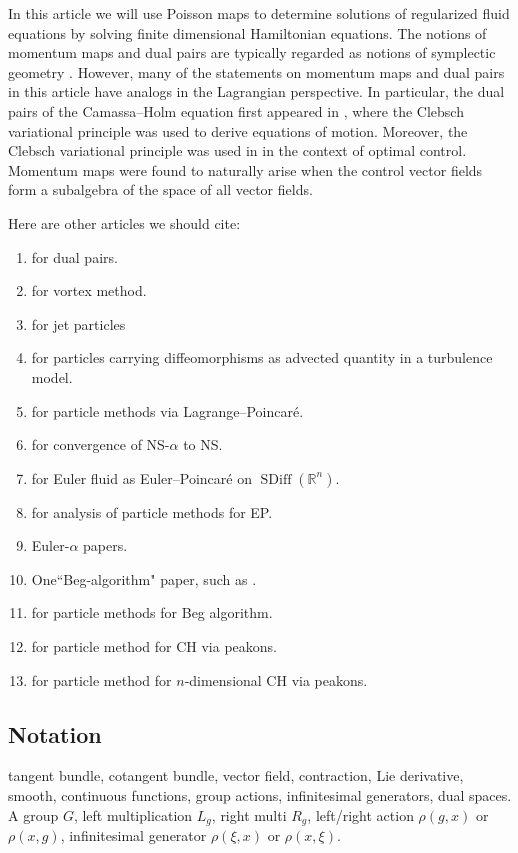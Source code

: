 \documentclass[12pt]{amsart}
\newcommand{\R}{\ensuremath{\mathbb{R}}}
\DeclareMathOperator{\SDiff}{SDiff}
\begin{document}
In this article we will use Poisson maps to determine solutions of regularized
fluid equations by solving finite dimensional Hamiltonian equations.
The notions of momentum maps and dual pairs are typically
regarded as notions of symplectic geometry \cite{FOM,Weinstein1983}.
However, many of the statements on momentum maps and
dual pairs in this article
have analogs in the Lagrangian perspective.
In particular, the dual pairs of the Camassa--Holm equation
first appeared in \cite{HolmMarsden2005}, where the Clebsch
variational principle was used to derive equations of motion.
Moreover, the Clebsch variational principle was used in
\cite{CotterHolm2009} in the context of optimal control.
Momentum maps were found to naturally arise when the
control vector fields form a subalgebra of the space of all
 vector fields.
 
 Here are other articles we should cite:
 \begin{enumerate}
 	\item \cite{MarsdenWeinstein1983,Weinstein1983} for dual pairs.
 	\item \cite{Chorin1973} for vortex method.
	\item \cite{Sommer2013,CotterHolmJacobsMeier2014} for jet particles
	\item \cite{HolmTronci2012} for particles carrying diffeomorphisms as advected quantity in a turbulence model.
 	\item \cite{JacobsRatiuDesbrun2013} for particle methods via Lagrange--Poincar\'e.
	\item \cite{FoiasHolmTiti2001} for convergence of NS-$\alpha$ to NS.
	\item \cite{Arnold1966} for Euler fluid as Euler--Poincar\'e on $\SDiff(\R^n)$.
	\item \cite{TrouveYounes2005} for analysis of particle methods for EP.
	\item Euler-$\alpha$ papers.
	\item One``Beg-algorithm" paper, such as \cite{Beg2005}.
	\item \cite{JoshiMiller2000} for particle methods for Beg algorithm.
	\item \cite{HoldenRaynaud2006} for particle method for CH via peakons.
	\item \cite{ChertockDuToitMarsden2012} for particle method for $n$-dimensional CH via peakons.
 \end{enumerate}

\subsection{Notation}
tangent bundle, cotangent bundle, vector field, contraction, Lie derivative,
smooth, continuous functions, group actions, infinitesimal generators,
dual spaces.  A group $G$, left multiplication $L_g$, right multi $R_g$, 
left/right action $\rho(g,x)$ or $\rho(x,g)$, infinitesimal generator $\rho(\xi,x)$ or $\rho(x,\xi)$.
\end{document}
